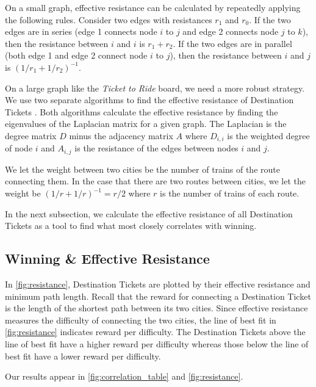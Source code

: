\begin{multicols}{2}
On a small graph, effective resistance can be calculated
by repeatedly applying the following rules.
Consider two edges with resistances $r_1$ and $r_0$.
If the two edges are in series (edge 1 connects node $i$ to $j$
and edge 2 connects node $j$ to $k$), then the resistance between
$i$ and $i$ is $r_1 + r_2$.
If the two edges are in parallel (both edge 1 and edge 2 connect
node $i$ to $j$), then the resistance between $i$ and $j$
is $(1/r_1 + 1/r_2)^{-1}$.

On a large graph like the \textit{Ticket to Ride} board, 
we need a more robust strategy.
We use two separate algorithms to find the effective resistance
of Destination Tickets
\cite{ellens2011effective, wu2004theory}.
Both algorithms calculate the effective resistance by finding 
the eigenvalues of the Laplacian matrix for a given graph.
The Laplacian is the degree matrix $D$ minus the adjacency
matrix $A$ where $D_{i,i}$ is the weighted degree of node $i$
and $A_{i,j}$ is the resistance of the edges between nodes
$i$ and $j$.

We let the weight between two cities be the number
of trains of the route connecting them.
In the case that there are two routes between cities,
we let the weight be $(1/r + 1/r)^{-1}=r/2$ where
$r$ is the number of trains of each route.

In the next subsection, we calculate the effective
resistance of all Destination Tickets as a tool
to find what most closely correlates with winning.

\subsection{Winning \& Effective Resistance}

In \cref{fig:resistance},
Destination Tickets are plotted by their effective resistance
and minimum path length.
Recall that the reward for connecting a Destination Ticket
is the length of the shortest path between its two cities.
Since effective resistance measures the difficulty of
connecting the two cities, the line of best fit in \cref{fig:resistance}
indicates reward per difficulty.
The Destination Tickets above the line of best fit have
a higher reward per difficulty whereas those below the line of best fit
have a lower reward per difficulty.

Our results appear in \cref{fig:correlation_table}
and \cref{fig:resistance}.

\end{multicols}
